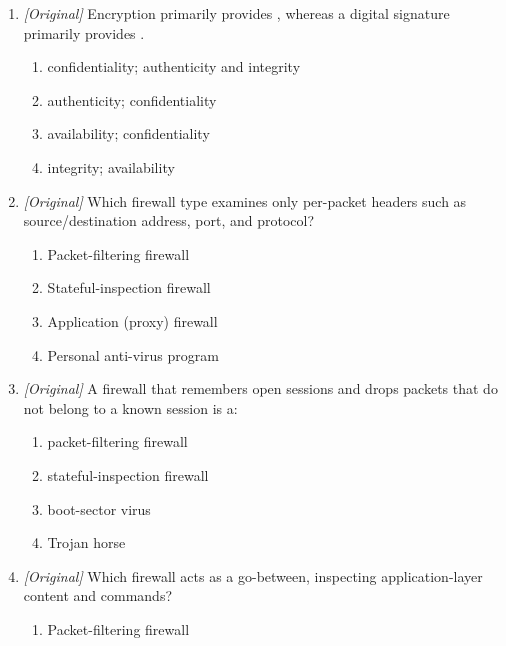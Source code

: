 \documentclass[11pt]{article}
\begin{document}
\begin{enumerate}[label=\textbf{Q\arabic*.}, leftmargin=*]
\begin{enumerate}[label=\Alph*.]
    \item It proves the message was not altered in transit.
    \item It provides integrity of the message.
    \item It encrypts the message body so only the recipient can read it.
  \end{enumerate}
\item \textit{[Original]} Encryption primarily provides \underline{\hspace{2.2cm}}, whereas a digital signature primarily provides \underline{\hspace{2.2cm}}.
  \begin{enumerate}[label=\Alph*.]
    \item confidentiality; authenticity and integrity
    \item authenticity; confidentiality
    \item availability; confidentiality
    \item integrity; availability
  \end{enumerate}
\item \textit{[Original]} Which firewall type examines only per-packet headers such as source/destination address, port, and protocol?
  \begin{enumerate}[label=\Alph*.]
    \item Packet-filtering firewall
    \item Stateful-inspection firewall
    \item Application (proxy) firewall
    \item Personal anti-virus program
  \end{enumerate}
\item \textit{[Original]} A firewall that remembers open sessions and drops packets that do not belong to a known session is a:
  \begin{enumerate}[label=\Alph*.]
    \item packet-filtering firewall
    \item stateful-inspection firewall
    \item boot-sector virus
    \item Trojan horse
  \end{enumerate}
\item \textit{[Original]} Which firewall acts as a go-between, inspecting application-layer content and commands?
  \begin{enumerate}[label=\Alph*.]
    \item Packet-filtering firewall

\end{enumerate}
\end{enumerate}
\end{document}
